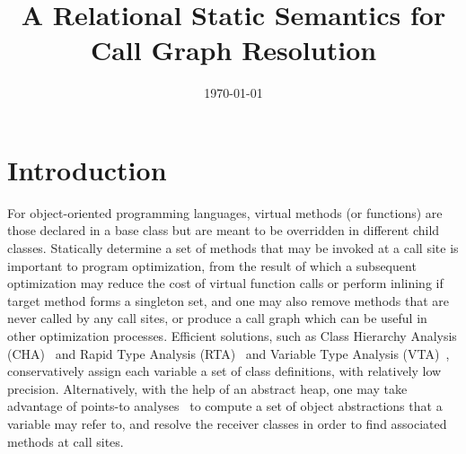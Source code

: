 \documentclass{llncs}
\title{A Relational Static Semantics for Call Graph Resolution}
\author{\today}
\institute{Jinan University}
\begin{document}
\maketitle


\section{Introduction}\label{sec:introduction}

For object-oriented programming languages, virtual methods (or functions) are those declared in a base class but are meant to be overridden in different child classes. Statically determine a set of methods that may be invoked at a call site is important to program optimization, from the result of which a subsequent optimization may reduce the cost of virtual function calls or perform inlining if target method forms a singleton set, and one may also remove methods that are never called by any call sites, or produce a call graph which can be useful in other optimization processes.
%
Efficient solutions, such as Class Hierarchy Analysis (CHA)~\cite{Dean1995,Fernandez1995} and Rapid Type Analysis (RTA)~\cite{Bacon1996} and Variable Type Analysis (VTA)~\cite{Sundaresan2000}, conservatively assign each variable a set of class definitions, with relatively low precision. Alternatively, with the help of an abstract heap, one may take advantage of points-to analyses~\cite{andersen94} to compute a set of object abstractions that a variable may refer to, and resolve the receiver classes in order to find associated methods at call sites.
\end{document}
